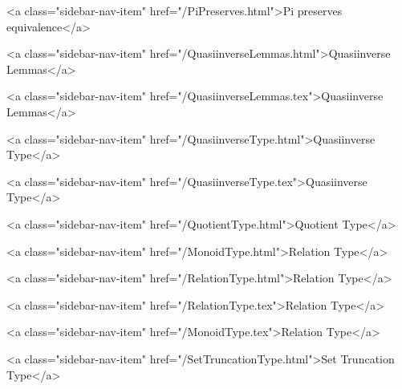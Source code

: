       
    
      
        
          <a class="sidebar-nav-item" href="/PiPreserves.html">Pi preserves equivalence</a>
        
      
    
      
        
          <a class="sidebar-nav-item" href="/QuasiinverseLemmas.html">Quasiinverse Lemmas</a>
        
      
    
      
        
          <a class="sidebar-nav-item" href="/QuasiinverseLemmas.tex">Quasiinverse Lemmas</a>
        
      
    
      
        
          <a class="sidebar-nav-item" href="/QuasiinverseType.html">Quasiinverse Type</a>
        
      
    
      
        
          <a class="sidebar-nav-item" href="/QuasiinverseType.tex">Quasiinverse Type</a>
        
      
    
      
        
          <a class="sidebar-nav-item" href="/QuotientType.html">Quotient Type</a>
        
      
    
      
        
          <a class="sidebar-nav-item" href="/MonoidType.html">Relation Type</a>
        
      
    
      
        
          <a class="sidebar-nav-item" href="/RelationType.html">Relation Type</a>
        
      
    
      
        
          <a class="sidebar-nav-item" href="/RelationType.tex">Relation Type</a>
        
      
    
      
        
          <a class="sidebar-nav-item" href="/MonoidType.tex">Relation Type</a>
        
      
    
      
        
          <a class="sidebar-nav-item" href="/SetTruncationType.html">Set Truncation Type</a>
        
